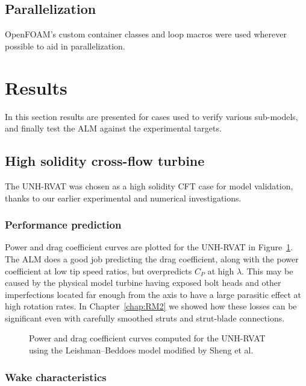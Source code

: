 \subsection{Parallelization}

OpenFOAM's custom container classes and loop macros were used wherever possible
to aid in parallelization.


\section{Results}

In this section results are presented for cases used to verify various
sub-models, and finally test the ALM against the experimental targets.


\subsection{High solidity cross-flow turbine}

The UNH-RVAT was chosen as a high solidity CFT case for model validation, thanks
to our earlier experimental and numerical investigations.



\subsubsection{Performance prediction}

Power and drag coefficient curves are plotted for the UNH-RVAT in
Figure~\ref{fig:RVAT-ALM-perf-curves}. The ALM does a good job predicting the
drag coefficient, along with the power coefficient at low tip speed ratios, but
overpredicts $C_P$ at high $\lambda$. This may be caused by the physical model
turbine having exposed bolt heads and other imperfections located far enough
from the axis to have a large parasitic effect at high rotation rates. In
Chapter~\ref{chap:RM2} we showed how these losses can be significant even with
carefully smoothed struts and strut-blade connections.

\begin{figure}
    \caption{Power and drag coefficient curves computed for the UNH-RVAT using
        the Leishman--Beddoes model modified by Sheng et al.}
    
    \label{fig:RVAT-ALM-perf-curves}
\end{figure}


\subsubsection{Wake characteristics}

